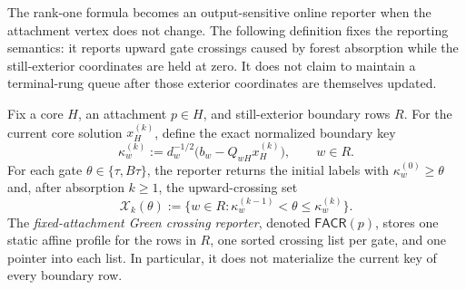 The rank-one formula becomes an output-sensitive online reporter when the
attachment vertex does not change.  The following definition fixes the
reporting semantics: it reports upward gate crossings caused by forest
absorption while the still-exterior coordinates are held at zero.  It does
not claim to maintain a terminal-rung queue after those exterior coordinates
are themselves updated.

\begin{definition}
\label{def:direct-fixed-attachment-reporter}
Fix a core $H$, an attachment $p\in H$, and still-exterior boundary rows
$R$.  For the current core solution $x_H^{(k)}$, define the exact normalized
boundary key
\begin{equation}
 \kappa_w^{(k)}
 :=d_w^{-1/2}\bigl(b_w-Q_{wH}x_H^{(k)}\bigr),
 \qquad w\in R.
 \label{eq:direct-fixed-attachment-key}
\end{equation}
For each gate $\theta\in\{\tau,B\tau\}$, the reporter returns the initial
labels with $\kappa_w^{(0)}\geq\theta$ and, after absorption $k\geq1$, the
upward-crossing set
\begin{equation}
 \mathcal X_k(\theta)
 :=\{w\in R:\kappa_w^{(k-1)}<\theta
                    \leq\kappa_w^{(k)}\}.
 \label{eq:direct-fixed-attachment-crossings}
\end{equation}
The \emph{fixed-attachment Green crossing reporter}, denoted
$\mathsf{FACR}(p)$, stores one static affine profile for the rows in $R$, one
sorted crossing list per gate, and one pointer into each list.  In
particular, it does not materialize the current key of every boundary row.
\end{definition}

